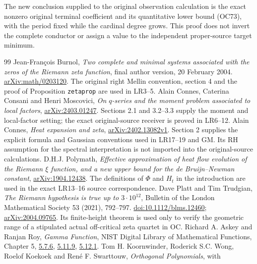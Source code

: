 \documentclass[11pt]{article}
\theoremstyle{remark}\newtheorem{remark}[theorem]{Remark}
\begin{document}
The new conclusion supplied to the original observation calculation is
the exact nonzero original terminal coefficient and its quantitative
lower bound (OC73), with the period fixed while the cardinal degree grows.
This proof does not invert the complete conductor or assign a value to
the independent proper-source target minimum.


\begin{thebibliography}{99}
 Jean-Fran\c cois Burnol,
\emph{Two complete and minimal systems associated with the zeros of the
Riemann zeta function}, final author version, 20 February 2004.
\href{https://arxiv.org/abs/math/0203120}{arXiv:math/0203120}.
The original right Mellin convention, section 4 and the proof of
Proposition \texttt{zetaprop} are used in LR3--5.
 Alain Connes, Caterina Consani and Henri Moscovici,
\emph{On $q$-series and the moment problem associated to local factors},
\href{https://arxiv.org/abs/2403.01247}{arXiv:2403.01247}.
Sections 2.1 and 3.2--3.3 supply the moment and local-factor setting;
the exact original-source receiver is proved in LR6--12.
 Alain Connes, \emph{Heat expansion and zeta},
\href{https://arxiv.org/abs/2402.13082v1}{arXiv:2402.13082v1}.
Section 2 supplies the explicit formula and Gaussian conventions used
in LR17--19 and GM. Its RH assumption for the spectral interpretation
is not imported into the original-source calculations.
 D.H.J. Polymath, \emph{Effective approximation of
heat flow evolution of the Riemann $\xi$ function, and a new upper
bound for the de Bruijn--Newman constant},
\href{https://arxiv.org/abs/1904.12438}{arXiv:1904.12438}.
The definitions of $\Phi$ and $H_t$ in the introduction are used in
the exact LR13--16 source correspondence.
 Dave Platt and Tim Trudgian,
\emph{The Riemann hypothesis is true up to $3\cdot10^{12}$},
Bulletin of the London Mathematical Society 53 (2021), 792--797.
\href{https://doi.org/10.1112/blms.12460}{doi:10.1112/blms.12460};
\href{https://arxiv.org/abs/2004.09765}{arXiv:2004.09765}.
Its finite-height theorem is used only to verify the geometric range
of a stipulated actual off-critical zeta quartet in OC.
 Richard A. Askey and Ranjan Roy,
\emph{Gamma Function}, NIST Digital Library of Mathematical Functions,
Chapter 5, \href{https://dlmf.nist.gov/5.7.E6}{5.7.6},
\href{https://dlmf.nist.gov/5.11.E9}{5.11.9},
\href{https://dlmf.nist.gov/5.12.E1}{5.12.1}.
 Tom H. Koornwinder, Roderick S.C. Wong, Roelof Koekoek
and Ren\'e F. Swarttouw, \emph{Orthogonal Polynomials}, with

\end{thebibliography}
\end{document}
